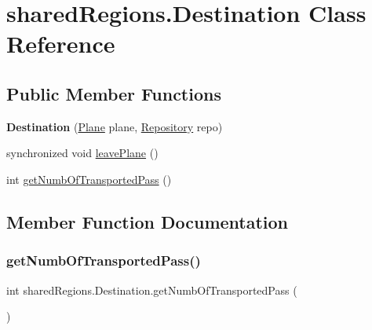 \hypertarget{classshared_regions_1_1_destination}{}\section{shared\+Regions.\+Destination Class Reference}
\label{classshared_regions_1_1_destination}
\subsection*{Public Member Functions}
\begin{DoxyCompactItemize}
\item 
\mbox{\label{classshared_regions_1_1_destination_a6e5faa10d3cf042c9775baf38f7db0d8}} 
{\bfseries Destination} (\hyperlink{classshared_regions_1_1_plane}{Plane} plane, \hyperlink{classshared_regions_1_1_repository}{Repository} repo)
\item 
synchronized void \hyperlink{classshared_regions_1_1_destination_a92d8a597465d7cb29ac87a41407794e7}{leave\+Plane} ()
\item 
int \hyperlink{classshared_regions_1_1_destination_ac2be96efc235a7cc7e6c7497e37bbe30}{get\+Numb\+Of\+Transported\+Pass} ()
\end{DoxyCompactItemize}


\subsection{Member Function Documentation}
\mbox{\label{classshared_regions_1_1_destination_ac2be96efc235a7cc7e6c7497e37bbe30}} 
\subsubsection{\texorpdfstring{get\+Numb\+Of\+Transported\+Pass()}{getNumbOfTransportedPass()}}
{\footnotesize\ttfamily int shared\+Regions.\+Destination.\+get\+Numb\+Of\+Transported\+Pass (\begin{DoxyParamCaption}{ }\end{DoxyParamCaption})\hspace{0.3cm}{\ttfamily [inline]}}

